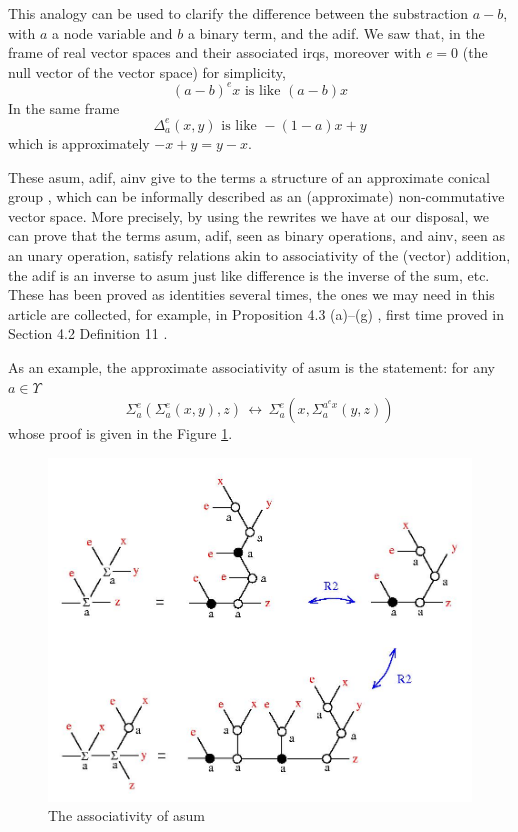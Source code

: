 \documentclass{article}
\begin{document}
This analogy can be used to clarify the difference between the substraction $a - b$, with $a$ a node variable and $b$ a binary term, and the adif. We saw that, in the frame of real vector spaces and their associated irqs,  moreover with $e=0$ (the null vector of the vector space) for simplicity, 
$$\displaystyle (a-b)^{e} x \mbox{  is like }   (a-b)x$$
 In the same frame  
$$\displaystyle \Delta_{a}^{e}(x,y) \mbox{ is like } -(1-a)x + y$$
which is approximately $\displaystyle -x+y = y-x$. 

These asum, adif, ainv give to the terms a structure of an approximate conical group \cite{buligainf}, which can be informally described as an (approximate) non-commutative vector space. 
More precisely, by using the rewrites we have at our disposal, we can prove that the terms asum, adif, seen as binary operations, and ainv, seen as an unary operation, satisfy relations akin to associativity of the (vector) addition, the adif is an inverse to asum just like difference is the inverse of the sum, etc. These has been proved as identities several times, the ones we may need in this article are collected, for example, in Proposition 4.3 (a)--(g) \cite{buligabraided}, first time proved in Section 4.2  Definition 11 \cite{buligadil1}. 

As an example, the approximate associativity of asum is the statement: for any $a \in \Upsilon$ 
$$ \Sigma_{a}^{e}\left( \Sigma_{a}^{e}\left(x,y\right), z\right) \, \longleftrightarrow \, \Sigma_{a}^{e}\left( x, \Sigma_{a}^{a^{e} x} \left( y,z\right)\right) $$
whose proof is given in the Figure \ref{sumassoc}. 
\begin{figure}[h]\centerline{\includegraphics[width=120mm]{jpg/sumassoc.jpg}}  \caption{ The associativity of asum } \label{sumassoc} \end{figure}
\end{document}
